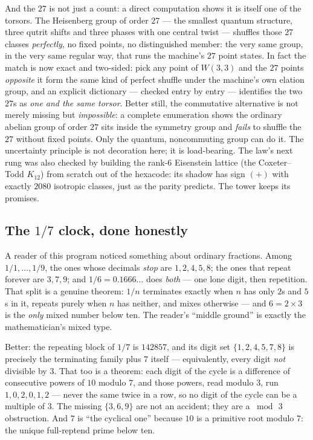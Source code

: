 \documentclass[11pt]{article}
\begin{document}
And the $27$ is not just a count: a direct computation shows it is itself one
of the torsors. The Heisenberg group of order $27$ --- the smallest quantum
structure, three qutrit shifts and three phases with one central twist ---
shuffles those $27$ classes \emph{perfectly}, no fixed points, no distinguished
member: the very same group, in the very same regular way, that runs the
machine's $27$ point states. In fact the match is now exact and two-sided:
pick any point of $W(3,3)$ and the $27$ points \emph{opposite} it form the
same kind of perfect shuffle under the machine's own elation group, and an
explicit dictionary --- checked entry by entry --- identifies the two $27$s as
\emph{one and the same torsor}. Better still, the commutative alternative is
not merely missing but \emph{impossible}: a complete enumeration shows the
ordinary abelian group of order $27$ sits inside the symmetry group and
\emph{fails} to shuffle the $27$ without fixed points. Only the quantum,
noncommuting group can do it. The uncertainty principle is not decoration
here; it is load-bearing. The law's next rung was also checked by building
the rank-$6$ Eisenstein lattice (the Coxeter--Todd $K_{12}$) from scratch out
of the hexacode: its shadow has sign $(+)$ with exactly $2080$ isotropic
classes, just as the parity predicts. The tower keeps its promises.

\subsection*{The $1/7$ clock, done honestly}

A reader of this program noticed something about ordinary fractions. Among
$1/1,\dots,1/9$, the ones whose decimals \emph{stop} are $1,2,4,5,8$; the ones
that repeat forever are $3,7,9$; and $1/6=0.1666\ldots$ does \emph{both} ---
one lone digit, then repetition. That split is a genuine theorem: $1/n$
terminates exactly when $n$ has only $2$s and $5$s in it, repeats purely when
$n$ has neither, and mixes otherwise --- and $6=2\times3$ is the \emph{only}
mixed number below ten. The reader's ``middle ground'' is exactly the
mathematician's mixed type.

Better: the repeating block of $1/7$ is $142857$, and its digit set
$\{1,2,4,5,7,8\}$ is precisely the terminating family plus $7$ itself ---
equivalently, every digit \emph{not} divisible by $3$. That too is a theorem:
each digit of the cycle is a difference of consecutive powers of $10$ modulo
$7$, and those powers, read modulo $3$, run $1,0,2,0,1,2$ --- never the same
twice in a row, so no digit of the cycle can be a multiple of $3$. The missing
$\{3,6,9\}$ are not an accident; they are a $\bmod\,3$ obstruction. And $7$ is
``the cyclical one'' because $10$ is a primitive root modulo $7$: the unique
full-reptend prime below ten.
\end{document}
